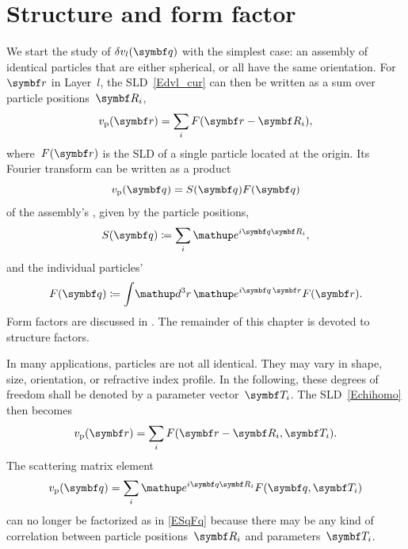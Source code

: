 \section{Structure and form factor}\label{SPartFactors}

We start the study of $\delta v_l(\q)$ with the simplest case:
an assembly of identical particles
that are either spherical, or all have the same orientation.
For $\r$ in Layer~$l$, the SLD~\cref{Edvl_cur}
can then be written as a sum over particle positions~$\R_i$,
\begin{equation}\label{Echihomo}
  v_\sp(\r) = \sum_i F(\r-\R_i),
\end{equation}
where~$F(\r)$ is the SLD of a single particle located at the origin.
Its Fourier transform can be written as a product
\begin{equation}\label{ESqFq}
  v_\sp(\q) = S(\q) F(\q)
\end{equation}
of the assembly's , given by the particle positions,
\begin{equation}\label{EdefSq}
  S(\q) \coloneqq \sum_i \e^{i\q\R_i},
\end{equation}
and the individual particles' 
\begin{equation}\label{EdefFq}
  F(\q) \coloneqq \int\!\d^3r\, \e^{i\v{q}\,\r} F(\r).
\end{equation}
Form factors are discussed in .
The remainder of this chapter is devoted to structure factors.

In many applications,
particles are not all identical.
They may vary in shape, size, orientation, or refractive index profile.
In the following, these degrees of freedom
shall be denoted by a parameter vector~$\v{T}_i$.
The SLD~\cref{Echihomo} then becomes
\begin{equation}\label{Echihetero}
  v_\sp(\r) = \sum_i F(\r-\R_i,\v{T}_i).
\end{equation}
The scattering matrix element
\begin{equation}\label{Echiqsum}
  v_\sp(\q) = \sum_i \e^{i\q\R_i} F(\q,\v{T}_i)
\end{equation}
can no longer be factorized as in \cref{ESqFq}
because there may be any kind of correlation
between particle positions~$\R_i$ and parameters~$\v{T}_i$.



